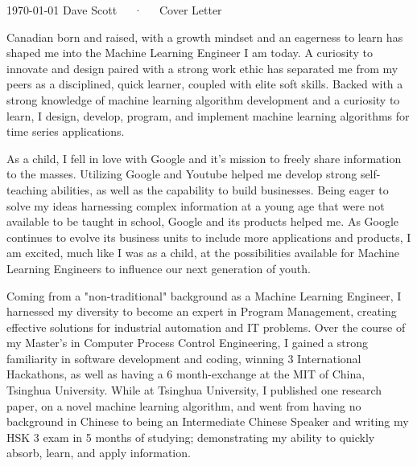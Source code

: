 \documentclass[11pt, a4paper]{awesome-cv}
\begin{document}
\makecvheader[R]

\makecvfooter
  {\today}
  {Dave Scott~~~·~~~Cover Letter}
  {}

\makelettertitle

\begin{cvletter}

Canadian born and raised, with a growth mindset and an eagerness to learn has shaped me into the Machine Learning Engineer I am today. A curiosity to innovate and design paired with a strong work ethic has separated me from my peers as a disciplined, quick learner, coupled with elite soft skills. Backed with a strong knowledge of machine learning algorithm development and a curiosity to learn, I design, develop, program, and implement machine learning algorithms for time series applications.

As a child, I fell in love with Google and it's mission to freely share information to the masses. Utilizing Google and Youtube helped me develop strong self-teaching abilities, as well as the capability to build businesses. Being eager to solve my ideas harnessing complex information at a young age that were not available to be taught in school, Google and its products helped me. As Google continues to evolve its business units to include more applications and products, I am excited, much like I was as a child, at the possibilities available for Machine Learning Engineers to influence our next generation of youth.

Coming from a "non-traditional" background as a Machine Learning Engineer, I harnessed my diversity to become an expert in Program Management, creating effective solutions for industrial automation and IT problems. Over the course of my Master's in Computer Process Control Engineering, I gained a strong familiarity in software development and coding, winning 3 International Hackathons, as well as having a 6 month-exchange at the MIT of China, Tsinghua University. While at Tsinghua University, I published one research paper, on a novel machine learning algorithm, and went from having no background in Chinese to being an Intermediate Chinese Speaker and writing my HSK 3 exam in 5 months of studying; demonstrating my ability to quickly absorb, learn, and apply information.

\end{cvletter}


\makeletterclosing
\end{document}
